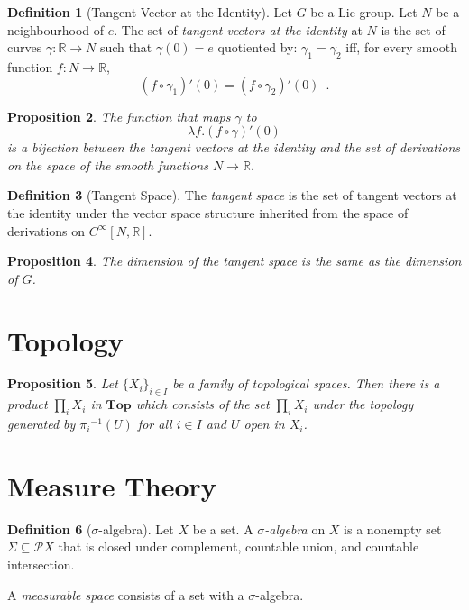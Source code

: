 \documentclass{book}
\newtheorem{prop}{Proposition}[chapter]
\theoremstyle{definition}
\newtheorem{df}[prop]{Definition}
\newcommand{\inv}[1]{\ensuremath{{#1}^{-1}}}
\begin{document}

\begin{df}[Tangent Vector at the Identity]
Let $G$ be a Lie group. Let $N$ be a neighbourhood of $e$. The set of \emph{tangent vectors at the identity} at $N$ is the set of curves $\gamma : \mathbb{R} \rightarrow N$ such that $\gamma(0) = e$ quotiented by: $\gamma_1 = \gamma_2$ iff, for every smooth function $f : N \rightarrow \mathbb{R}$,
\[ (f \circ \gamma_1)'(0) = (f \circ \gamma_2)'(0) \enspace . \]
\end{df}

\begin{prop}
The function that maps $\gamma$ to
\[ \lambda f. (f \circ \gamma)'(0) \]
 is a bijection between the tangent vectors at the identity and the set of derivations on the space of the smooth functions $N \rightarrow \mathbb{R}$.
 \end{prop}
 
 
\begin{df}[Tangent Space]
The \emph{tangent space} is the set of tangent vectors at the identity under the vector space structure inherited from the space of derivations on $C^\infty[N, \mathbb{R}]$.
\end{df}

\begin{prop}
The dimension of the tangent space is the same as the dimension of $G$.
\end{prop}


\part{Topology}

\begin{prop}
Let $\{ X_i \}_{i \in I}$ be a family of topological spaces. Then there is a product $\prod_i X_i$ in $\mathbf{Top}$ which consists of the set $\prod_i X_i$ under the topology generated by $\inv{\pi_i}(U)$ for all $i \in I$ and $U$ open in $X_i$.
\end{prop}

\part{Measure Theory}

\begin{df}[$\sigma$-algebra]
Let $X$ be a set. A \emph{$\sigma$-algebra} on $X$ is a nonempty set $\Sigma \subseteq \mathcal{P} X$ that is closed under complement, countable union, and countable intersection.

A \emph{measurable space} consists of a set with a $\sigma$-algebra.
\end{df}
\end{document}
